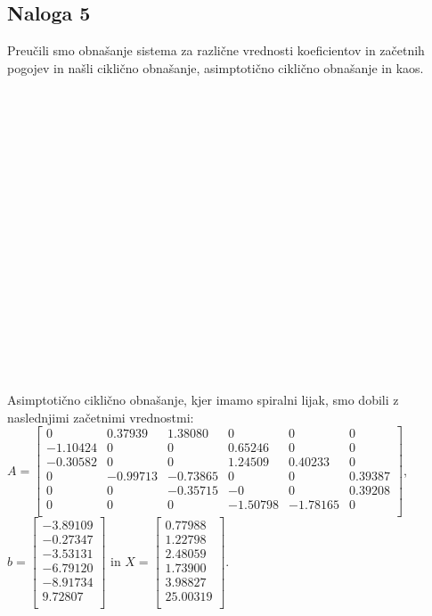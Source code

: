 \documentclass[a4paper, 12pt]{article}
\begin{document}
\subsection{Naloga 5}
Preučili smo obnašanje sistema za različne vrednosti koeficientov in začetnih pogojev
in našli ciklično obnašanje, asimptotično ciklično obnašanje in kaos.\\
\\
\\
\\
\\
\\
\\
\\
\\
\\
\\
\\
\\
\\
\\
\\
\\
\\
\\
Asimptotično ciklično obnašanje, kjer imamo spiralni lijak, smo dobili z naslednjimi začetnimi vrednostmi:\\
$ A =
\begin{bmatrix}
	0 & 0.37939 & 1.38080 & 0 & 0 & 0 \\
	-1.10424 & 0 & 0 & 0.65246 & 0 & 0 \\
	-0.30582 & 0 & 0 & 1.24509 & 0.40233 & 0 \\
	0 & -0.99713 & -0.73865 & 0 & 0 & 0.39387 \\
	0 & 0 & -0.35715 & -0 & 0 & 0.39208 \\
	0 & 0 & 0 & -1.50798 & -1.78165 & 0 \\
\end{bmatrix} $, \\
$ b =
\begin{bmatrix}
	-3.89109 \\
	-0.27347 \\
	-3.53131 \\
	-6.79120 \\
	-8.91734 \\
	9.72807 \\
\end{bmatrix} $ in
$ X =
\begin{bmatrix}
	0.77988 \\
	1.22798 \\
	2.48059 \\
	1.73900 \\
	3.98827 \\
	25.00319 \\
\end{bmatrix} $. \\
\end{document}
